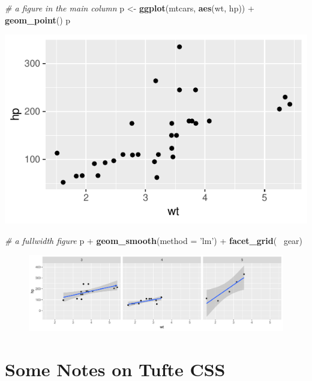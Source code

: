 \documentclass[]{tufte-handout}
\newenvironment{Shaded}{}{}
\newcommand{\KeywordTok}[1]{\textcolor[rgb]{0.00,0.44,0.13}{\textbf{#1}}}
\newcommand{\DataTypeTok}[1]{\textcolor[rgb]{0.56,0.13,0.00}{#1}}
\newcommand{\StringTok}[1]{\textcolor[rgb]{0.25,0.44,0.63}{#1}}
\newcommand{\CommentTok}[1]{\textcolor[rgb]{0.38,0.63,0.69}{\textit{#1}}}
\newcommand{\OperatorTok}[1]{\textcolor[rgb]{0.40,0.40,0.40}{#1}}
\newcommand{\NormalTok}[1]{#1}
\begin{document}
\begin{Shaded}
\begin{Highlighting}[]
\CommentTok{# a figure in the main column}
\NormalTok{p <-}\StringTok{ }\KeywordTok{ggplot}\NormalTok{(mtcars, }\KeywordTok{aes}\NormalTok{(wt, hp)) }\OperatorTok{+}\StringTok{ }\KeywordTok{geom_point}\NormalTok{()}
\NormalTok{p}
\end{Highlighting}
\end{Shaded}

\includegraphics{TufteExample_files/figure-latex/fig-nocap-main-1}

\begin{Shaded}
\begin{Highlighting}[]
\CommentTok{# a fullwidth figure}
\NormalTok{p }\OperatorTok{+}\StringTok{ }\KeywordTok{geom_smooth}\NormalTok{(}\DataTypeTok{method =} \StringTok{'lm'}\NormalTok{) }\OperatorTok{+}\StringTok{ }\KeywordTok{facet_grid}\NormalTok{(}\OperatorTok{~}\StringTok{ }\NormalTok{gear)}
\end{Highlighting}
\end{Shaded}

\begin{figure}
\includegraphics{TufteExample_files/figure-latex/fig-nocap-fullwidth-1} \end{figure}

\section{Some Notes on Tufte CSS}\label{some-notes-on-tufte-css}
\end{document}

